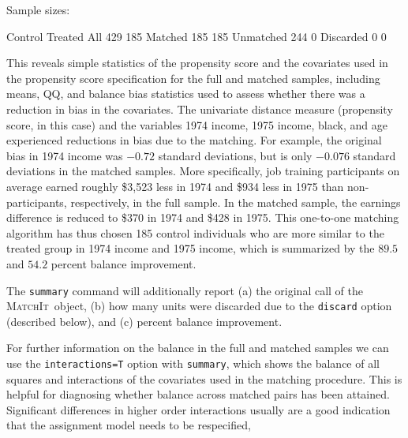 \documentclass[oneside,letterpaper,titlepage]{article}
\newcommand{\MatchIt}{\textsc{MatchIt}}
\begin{document}
\begin{enumerate}
\begin{Schunk}
\begin{Soutput}
Sample sizes:

          Control Treated
All           429     185
Matched       185     185
Unmatched     244       0
Discarded       0       0


\end{Soutput}
\end{Schunk}

This reveals simple statistics of the propensity score and the
covariates used in the propensity score specification for the full and
matched samples, including means, QQ, and balance bias statistics used
to assess whether there was a reduction in bias in the covariates.
The univariate distance measure (propensity score, in this case) and the variables 1974 income, 1975 income, black, and age
experienced reductions in bias due to the matching.  For example, the
original bias in 1974 income was $-0.72$ standard deviations, but is
only $-0.076$ standard deviations in the matched samples.  More
specifically, job training participants on average earned roughly
\$3,523 less in 1974 and \$934 less in 1975 than non-participants,
respectively, in the full sample.  In the matched sample, the earnings
difference is reduced to \$370 in 1974 and \$428 in 1975.  This
one-to-one matching algorithm has thus chosen 185 control individuals
who are more similar to the treated group in 1974 income and 1975
income, which is summarized by the $89.5$ and $54.2$ percent
balance improvement. 

The \texttt{summary} command will additionally report (a) the original
call of the \MatchIt\ object, (b) how many units were discarded due
to the \texttt{discard} option (described below), and (c) percent
balance improvement.  

For further information on the balance in the full and matched samples
we can use the {\tt interactions=T} option with {\tt summary}, which
shows the balance of all squares and interactions of the covariates
used in the matching procedure.  This is helpful for diagnosing
whether balance across matched pairs has been attained.  Significant
differences in higher order interactions usually are a good indication
that the assignment model needs to be respecified, %


\end{enumerate}
\end{document}
